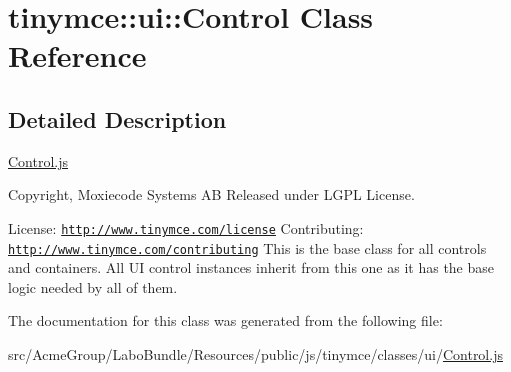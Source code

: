 \hypertarget{classtinymce_1_1ui_1_1_control}{\section{tinymce\+:\+:ui\+:\+:Control Class Reference}
\label{classtinymce_1_1ui_1_1_control}
}


\subsection{Detailed Description}
\hyperlink{_control_8js}{Control.\+js}

Copyright, Moxiecode Systems A\+B Released under L\+G\+P\+L License.

License\+: \href{http://www.tinymce.com/license}{\tt http\+://www.\+tinymce.\+com/license} Contributing\+: \href{http://www.tinymce.com/contributing}{\tt http\+://www.\+tinymce.\+com/contributing} This is the base class for all controls and containers. All U\+I control instances inherit from this one as it has the base logic needed by all of them. 

The documentation for this class was generated from the following file\+:\begin{DoxyCompactItemize}
\item 
src/\+Acme\+Group/\+Labo\+Bundle/\+Resources/public/js/tinymce/classes/ui/\hyperlink{_control_8js}{Control.\+js}\end{DoxyCompactItemize}
